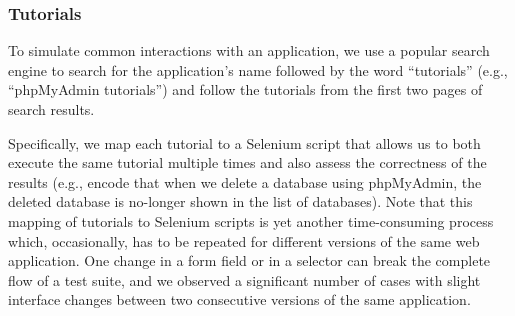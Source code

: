 


\subsubsection{Tutorials}
\label{sec:tutorials}
To simulate common interactions with an application, we use a popular search
engine to search for the application's name followed by the word ``tutorials''
(e.g., ``phpMyAdmin tutorials'') and follow the tutorials from the first two
pages of search results.

Specifically, we map each tutorial to a Selenium script that allows us to
both execute the same tutorial multiple times and also assess the correctness
of the results (e.g., encode that when we delete a database using phpMyAdmin,
the deleted database is no-longer shown in the list of databases). Note that
this mapping of tutorials to Selenium scripts is yet another time-consuming
process which, occasionally, has to be repeated for different versions of
the same web application. One change in a form field or in a selector can
break the complete flow of a test suite, and we observed a significant number
of cases with slight interface changes between two consecutive versions of
the same application.

